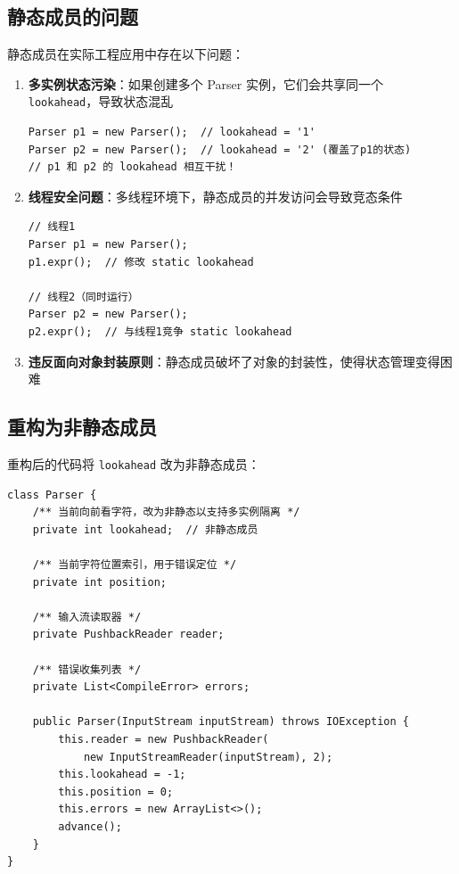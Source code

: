 \documentclass[a4paper]{article}
\begin{document}
\subsection{静态成员的问题}

静态成员在实际工程应用中存在以下问题：

\begin{enumerate}
    \item \textbf{多实例状态污染}：如果创建多个 Parser 实例，它们会共享同一个 \texttt{lookahead}，导致状态混乱
    
    \begin{lstlisting}[caption={多实例状态污染示例}]
Parser p1 = new Parser();  // lookahead = '1'
Parser p2 = new Parser();  // lookahead = '2' (覆盖了p1的状态)
// p1 和 p2 的 lookahead 相互干扰！
\end{lstlisting}

    \item \textbf{线程安全问题}：多线程环境下，静态成员的并发访问会导致竞态条件
    
    \begin{lstlisting}[caption={线程安全问题示例}]
// 线程1
Parser p1 = new Parser();
p1.expr();  // 修改 static lookahead

// 线程2（同时运行）
Parser p2 = new Parser();
p2.expr();  // 与线程1竞争 static lookahead
\end{lstlisting}

    \item \textbf{违反面向对象封装原则}：静态成员破坏了对象的封装性，使得状态管理变得困难
\end{enumerate}

\subsection{重构为非静态成员}

重构后的代码将 \texttt{lookahead} 改为非静态成员：

\begin{lstlisting}[caption={非静态成员声明}]
class Parser {
    /** 当前向前看字符，改为非静态以支持多实例隔离 */
    private int lookahead;  // 非静态成员
    
    /** 当前字符位置索引，用于错误定位 */
    private int position;
    
    /** 输入流读取器 */
    private PushbackReader reader;
    
    /** 错误收集列表 */
    private List<CompileError> errors;
    
    public Parser(InputStream inputStream) throws IOException {
        this.reader = new PushbackReader(
            new InputStreamReader(inputStream), 2);
        this.lookahead = -1;
        this.position = 0;
        this.errors = new ArrayList<>();
        advance();
    }
}
\end{lstlisting}
\end{document}
